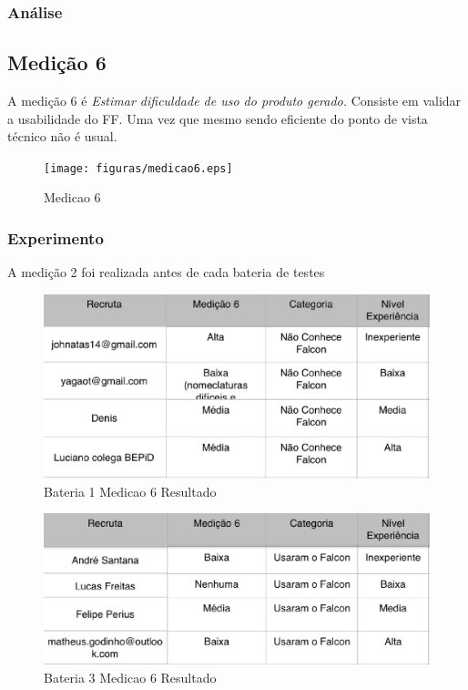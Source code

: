 \subsubsection{Análise}


\subsection{Medição 6}

A medição 6 é \textit{Estimar dificuldade de uso do produto gerado.} Consiste em validar a usabilidade do FF. Uma vez que
mesmo sendo eficiente do ponto de vista técnico não é usual.

\begin{figure}[H]
  \centering
  \label{fig:indicadores}
  \texttt{[image: figuras/medicao6.eps]}
  \caption{Medicao 6}
\end{figure}

\subsubsection{Experimento}

A medição 2 foi realizada antes de cada bateria de testes


\begin{figure}[H]
  \centering
  \label{fig:indicadores}
  \includegraphics[keepaspectratio=true,scale=0.6]{figuras/Bateria1Medicao6.eps}
  \caption{Bateria 1 Medicao 6 Resultado}
\end{figure}


\begin{figure}[H]
  \centering
  \label{fig:indicadores}
  \includegraphics[keepaspectratio=true,scale=0.6]{figuras/Bateria3Medicao6.eps}
  \caption{Bateria 3 Medicao 6 Resultado}
\end{figure}



